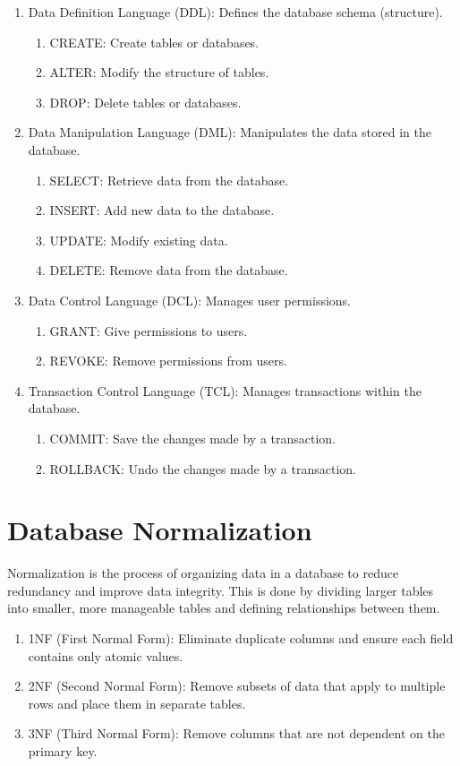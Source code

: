 \documentclass[openany]{book} %
\begin{document}
\begin{enumerate}
\item Data Definition Language (DDL): Defines the database schema (structure).
\begin{enumerate}
\item CREATE: Create tables or databases.
\item ALTER: Modify the structure of tables.
\item DROP: Delete tables or databases.
\end{enumerate}
\item Data Manipulation Language (DML): Manipulates the data stored in the database.
\begin{enumerate}
\item SELECT: Retrieve data from the database.
\item INSERT: Add new data to the database.
\item UPDATE: Modify existing data.
\item DELETE: Remove data from the database.
\end{enumerate}
\item Data Control Language (DCL): Manages user permissions.
\begin{enumerate}
\item GRANT: Give permissions to users.
\item REVOKE: Remove permissions from users.
\end{enumerate}
\item Transaction Control Language (TCL): Manages transactions within the database.
\begin{enumerate}
\item COMMIT: Save the changes made by a transaction.
\item ROLLBACK: Undo the changes made by a transaction.
\end{enumerate}
\end{enumerate}

\section{Database Normalization}
Normalization is the process of organizing data in a database to reduce redundancy and improve data integrity. This is done by dividing larger tables into smaller, more manageable tables and defining relationships between them.
\begin{enumerate}
    \item 1NF (First Normal Form): Eliminate duplicate columns and ensure each field contains only atomic values.
    \item 2NF (Second Normal Form): Remove subsets of data that apply to multiple rows and place them in separate tables.
    \item 3NF (Third Normal Form): Remove columns that are not dependent on the primary key.
\end{enumerate}
\end{document}
